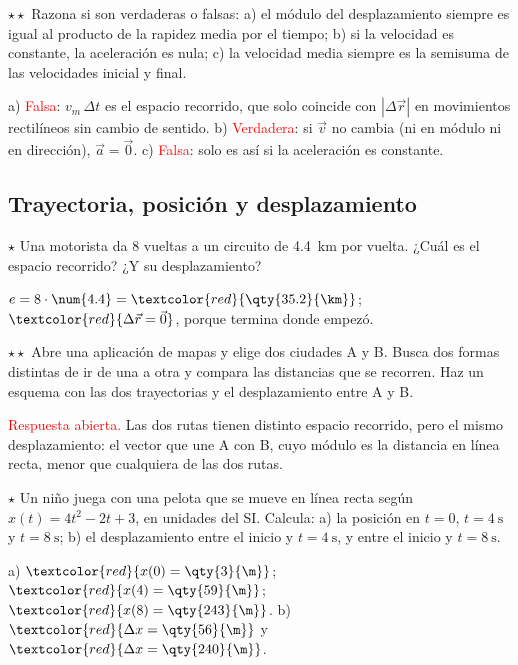 \begin{exercise}
    \(\star\star\) Razona si son verdaderas o falsas: a) el módulo del desplazamiento siempre es igual al producto de la rapidez
    media por el tiempo; b) si la velocidad es constante, la aceleración es nula; c) la velocidad media siempre es la semisuma de
    las velocidades inicial y final.
    \begin{solu}
        a) \textcolor{red}{Falsa}: \(v_m\,\Delta t\) es el espacio recorrido, que solo coincide con \(|\Delta\vec r|\) en movimientos
        rectilíneos sin cambio de sentido. b) \textcolor{red}{Verdadera}: si \(\vec v\) no cambia (ni en módulo ni en dirección),
        \(\vec a = \vec 0\). c) \textcolor{red}{Falsa}: solo es así si la aceleración es constante.
    \end{solu}
\end{exercise}

\subsection{Trayectoria, posición y desplazamiento}

\begin{exercise}
    \(\star\) Una motorista da 8 vueltas a un circuito de \qty{4.4}{\km} por vuelta. ¿Cuál es el espacio recorrido? ¿Y su
    desplazamiento?
    \begin{solu}
        \(e = 8 \cdot \num{4.4} = \textcolor{red}{\qty{35.2}{\km}}\); \(\textcolor{red}{\Delta\vec r = \vec 0}\), porque termina donde
        empezó.
    \end{solu}
\end{exercise}

\begin{exercise}
    \(\star\star\) Abre una aplicación de mapas y elige dos ciudades A y B. Busca dos formas distintas de ir de una a otra y compara
    las distancias que se recorren. Haz un esquema con las dos trayectorias y el desplazamiento entre A y B.
    \begin{solu}
        \textcolor{red}{Respuesta abierta.} Las dos rutas tienen distinto espacio recorrido, pero el mismo desplazamiento: el
        vector que une A con B, cuyo módulo es la distancia en línea recta, menor que cualquiera de las dos rutas.
    \end{solu}
\end{exercise}

\begin{exercise}
    \(\star\) Un niño juega con una pelota que se mueve en línea recta según \(x(t) = 4t^2 - 2t + 3\), en unidades del SI.
    Calcula: a) la posición en \(t = 0\), \(t = \qty{4}{\s}\) y \(t = \qty{8}{\s}\); b) el desplazamiento entre el inicio y
    \(t = \qty{4}{\s}\), y entre el inicio y \(t = \qty{8}{\s}\).
    \begin{solu}
        a) \(\textcolor{red}{x(0) = \qty{3}{\m}}\); \(\textcolor{red}{x(4) = \qty{59}{\m}}\); \(\textcolor{red}{x(8) = \qty{243}{\m}}\).
        b) \(\textcolor{red}{\Delta x = \qty{56}{\m}}\) y \(\textcolor{red}{\Delta x = \qty{240}{\m}}\).
    \end{solu}
\end{exercise}

